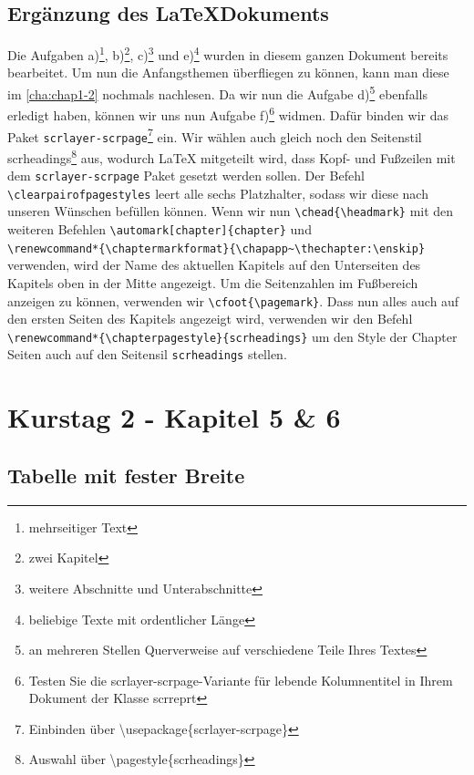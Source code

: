 \documentclass[
12pt,
ngerman
]{scrreprt}
\renewcommand*{\chaptermarkformat}{\chapapp~\thechapter:\enskip}
\renewcommand*{\chapterpagestyle}{scrheadings}
\begin{document}
\section{Ergänzung des \LaTeX \:Dokuments}
\label{sec:ergaenzung}
Die Aufgaben a)\footnote{mehrseitiger Text}, b)\footnote{zwei Kapitel}, c)\footnote{weitere Abschnitte und Unterabschnitte} und e)\footnote{beliebige Texte mit ordentlicher Länge} wurden in diesem ganzen Dokument bereits bearbeitet. Um nun  die Anfangsthemen überfliegen zu können, kann man diese im \cref{cha:chap1-2} nochmals nachlesen. Da wir nun die Aufgabe d)\footnote{an mehreren Stellen Querverweise auf verschiedene Teile Ihres Textes} ebenfalls erledigt haben, können wir uns nun Aufgabe f)\footnote{Testen Sie die scrlayer-scrpage-Variante für lebende Kolumnentitel in Ihrem
Dokument der Klasse scrreprt} widmen. Dafür binden wir das Paket \verb!scrlayer-scrpage!\footnote{\label{fn:scrlayer-scrpage}Einbinden über \textbackslash usepackage\{scrlayer-scrpage\}} ein. Wir wählen auch gleich noch den Seitenstil scrheadings\footnote{\label{fn:scrheadings}Auswahl über \textbackslash pagestyle\{scrheadings\}} aus, wodurch LaTeX mitgeteilt wird, dass Kopf- und Fußzeilen mit dem \verb!scrlayer-scrpage! Paket gesetzt werden sollen. Der Befehl \verb!\clearpairofpagestyles! leert alle sechs Platzhalter, sodass wir diese nach unseren Wünschen befüllen können. Wenn wir nun \verb!\chead{\headmark}! mit den weiteren Befehlen \verb!\automark[chapter]{chapter}! und \\ \verb!\renewcommand*{\chaptermarkformat}{\chapapp~\thechapter:\enskip}! verwenden, wird der Name des aktuellen Kapitels auf den Unterseiten des Kapitels oben in der Mitte angezeigt.
Um die Seitenzahlen im Fußbereich anzeigen zu können, verwenden wir \verb!\cfoot{\pagemark}!. Dass nun alles auch auf den ersten Seiten des Kapitels angezeigt wird, verwenden wir den Befehl \verb!\renewcommand*{\chapterpagestyle}{scrheadings}! um den Style der Chapter Seiten auch auf den Seitensil \verb!scrheadings! stellen.


\chapter[Blatt 3]{Kurstag 2 - Kapitel 5 \& 6}
\label{cha:chap5-6}
\label{blatt:3}

\section{Tabelle mit fester Breite}
\label{sec:table-fixed}
\end{document}
